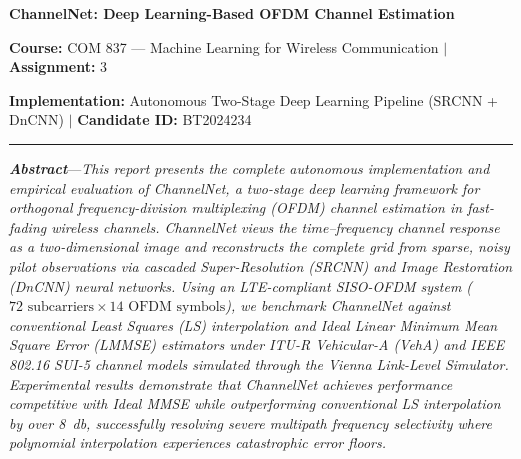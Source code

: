 \documentclass[10pt,a4paper]{article}
\begin{document}
\begin{center}
  {\fontsize{20}{23}\bfseries\color{navy} ChannelNet: Deep Learning-Based OFDM Channel Estimation\par}
  \vspace{2pt}
  {\fontsize{9}{11}\selectfont\color{subgray}
    \textbf{Course:} COM 837 --- Machine Learning for Wireless Communication \quad$|$\quad
    \textbf{Assignment:} 3\par
    \textbf{Implementation:} Autonomous Two-Stage Deep Learning Pipeline (SRCNN + DnCNN) \quad$|$\quad
    \textbf{Candidate ID:} BT2024234\par
  }
  \vspace{2pt}
  {\color{rulecolor}\rule{\linewidth}{0.65pt}}
\end{center}
\vspace{-4pt}

\textbf{\textit{Abstract}}---\textit{This report presents the complete autonomous implementation and empirical evaluation of ChannelNet, a two-stage deep learning framework for orthogonal frequency-division multiplexing (OFDM) channel estimation in fast-fading wireless channels. ChannelNet views the time--frequency channel response as a two-dimensional image and reconstructs the complete grid from sparse, noisy pilot observations via cascaded Super-Resolution (SRCNN) and Image Restoration (DnCNN) neural networks. Using an LTE-compliant SISO-OFDM system ($72 \text{ subcarriers} \times 14 \text{ OFDM symbols}$), we benchmark ChannelNet against conventional Least Squares (LS) interpolation and Ideal Linear Minimum Mean Square Error (LMMSE) estimators under ITU-R Vehicular-A (VehA) and IEEE 802.16 SUI-5 channel models simulated through the Vienna Link-Level Simulator. Experimental results demonstrate that ChannelNet achieves performance competitive with Ideal MMSE while outperforming conventional LS interpolation by over \SI{8}{\decibel}, successfully resolving severe multipath frequency selectivity where polynomial interpolation experiences catastrophic error floors.}
\end{document}
